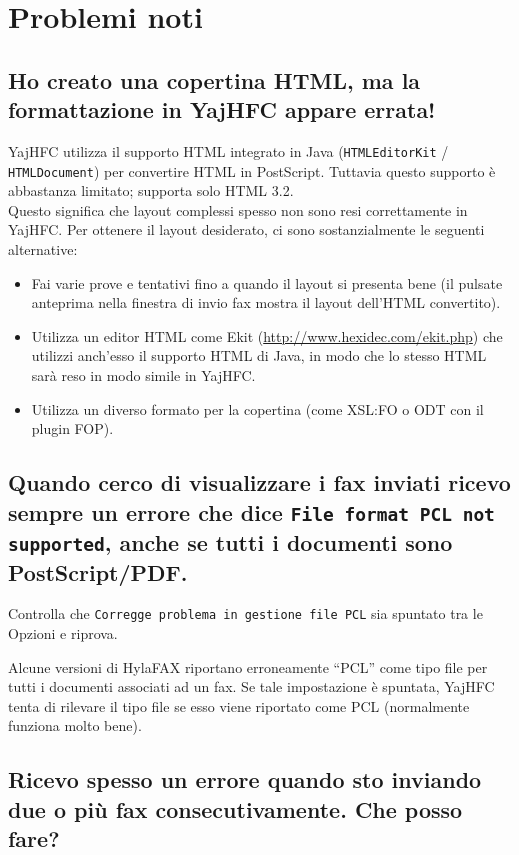 \documentclass[a4paper,10pt]{scrartcl}
\begin{document}
\section{Problemi noti}

\subsection{Ho creato una copertina HTML, ma la formattazione in YajHFC appare errata!}

YajHFC utilizza il supporto HTML integrato in Java (\texttt{HTMLEditorKit} / \texttt{HTMLDocument}) per convertire HTML in PostScript. Tuttavia questo supporto è abbastanza limitato; supporta solo HTML 3.2.\\
Questo significa che layout complessi spesso non sono resi correttamente in YajHFC.
Per ottenere il layout desiderato, ci sono sostanzialmente le seguenti alternative:

\begin{itemize}
 \item Fai varie prove e tentativi fino a quando il layout si presenta bene (il pulsate anteprima nella finestra di invio fax mostra il layout dell'HTML convertito).
 \item Utilizza un editor HTML come Ekit (\url{http://www.hexidec.com/ekit.php}) che utilizzi anch'esso il supporto HTML di Java, in modo che lo stesso HTML sarà reso in modo simile in YajHFC.
 \item Utilizza un diverso formato per la copertina (come XSL:FO o ODT con il plugin FOP).
\end{itemize}

\subsection{Quando cerco di visualizzare i fax inviati ricevo sempre un errore che dice 
   \texttt{File format PCL not supported}, anche se tutti i documenti sono PostScript/PDF.}

Controlla che \texttt{Corregge problema in gestione file PCL} sia spuntato tra le Opzioni e riprova.

Alcune versioni di HylaFAX riportano erroneamente ``PCL'' come tipo file per tutti i documenti
associati ad un fax. Se tale impostazione è spuntata, YajHFC tenta di rilevare il tipo file
se esso viene riportato come PCL (normalmente funziona molto bene).

\subsection{Ricevo spesso un errore quando sto inviando due o più fax consecutivamente. Che posso fare?}
\end{document}
